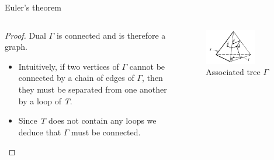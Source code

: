 \documentclass{beamer}
\begin{document}
\begin{frame}{Euler's theorem}
  \begin{columns}
    \begin{column}{0.6\textwidth}
      \begin{proof}
        Dual $\Gamma$ is connected and is therefore a graph.
        \begin{itemize}
        \item Intuitively, if two vertices of $\Gamma$ cannot be connected by a chain of edges of $\Gamma$, then they must be separated from one another by a loop of \textsl{T}.
        \item Since \textsl{T} does not contain any loops we deduce that $\Gamma$ must be connected.
        \end{itemize}
      \end{proof}
    \end{column}
    \begin{column}{0.4\textwidth}
      \begin{figure}
        \centering
        \includegraphics[width=0.7\textwidth]{figure_1_5_c.png}
        \caption{Associated tree $\Gamma$}
      \end{figure}
    \end{column}
  \end{columns}
\end{frame}
\end{document}
